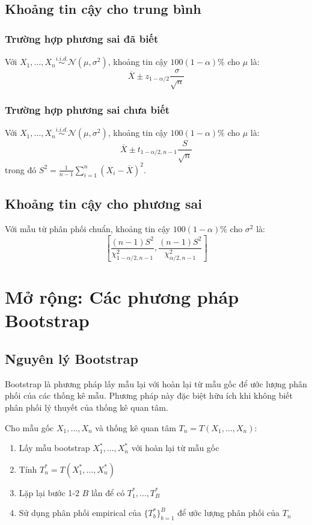 \subsection{Khoảng tin cậy cho trung bình}
\subsubsection*{Trường hợp phương sai đã biết}
Với $X_1, \ldots, X_n \overset{i.i.d.}{\sim} \mathcal{N}(\mu, \sigma^2)$, khoảng tin cậy $100(1-\alpha)\%$ cho $\mu$ là:
\[
\overline{X} \pm z_{1-\alpha/2} \frac{\sigma}{\sqrt{n}}
\]

\subsubsection*{Trường hợp phương sai chưa biết}
Với $X_1, \ldots, X_n \overset{i.i.d.}{\sim} \mathcal{N}(\mu, \sigma^2)$, khoảng tin cậy $100(1-\alpha)\%$ cho $\mu$ là:
\[
\overline{X} \pm t_{1-\alpha/2, n-1} \frac{S}{\sqrt{n}}
\]
trong đó $S^2 = \frac{1}{n-1}\sum_{i=1}^n (X_i - \overline{X})^2$.

\subsection{Khoảng tin cậy cho phương sai}
Với mẫu từ phân phối chuẩn, khoảng tin cậy $100(1-\alpha)\%$ cho $\sigma^2$ là:
\[
\left[\frac{(n-1)S^2}{\chi^2_{1-\alpha/2, n-1}}, \frac{(n-1)S^2}{\chi^2_{\alpha/2, n-1}}\right]
\]

\section{Mở rộng: Các phương pháp Bootstrap}

\subsection{Nguyên lý Bootstrap}
Bootstrap là phương pháp lấy mẫu lại với hoàn lại từ mẫu gốc để ước lượng phân phối của các thống kê mẫu. Phương pháp này đặc biệt hữu ích khi không biết phân phối lý thuyết của thống kê quan tâm.

\begin{dl}
Cho mẫu gốc $X_1, \ldots, X_n$ và thống kê quan tâm $T_n = T(X_1, \ldots, X_n)$:
\begin{enumerate}
    \item Lấy mẫu bootstrap $X_1^*, \ldots, X_n^*$ với hoàn lại từ mẫu gốc
    \item Tính $T_n^* = T(X_1^*, \ldots, X_n^*)$
    \item Lặp lại bước 1-2 $B$ lần để có $T_1^*, \ldots, T_B^*$
    \item Sử dụng phân phối empirical của $\{T_b^*\}_{b=1}^B$ để ước lượng phân phối của $T_n$
\end{enumerate}
\end{dl}

